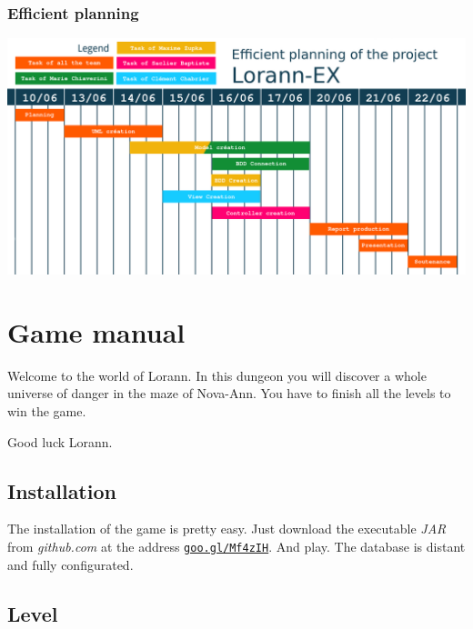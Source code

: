 \documentclass{report}
\begin{document}
\subsection{Efficient planning}

\begin{center}
\includegraphics[scale=0.75]{resources/Planning-effectif.png}
\end{center}

\chapter{Game manual}

Welcome to the world of Lorann. In this dungeon you will discover a whole universe of danger in the maze of Nova-Ann. You have to finish all the levels to win the game.

Good luck Lorann.

\section{Installation}

The installation of the game is pretty easy. Just download the executable \emph{JAR} from \emph{github.com} at the address \texttt{\href{https://github.com/EpicKiwi/Lorann-Ex/releases/download/0.0.2/Lorann-Ex-0.0.2-SNAPSHOT.jar}{goo.gl/Mf4zIH}}. And play. The database is distant and fully configurated.

\section{Level}
\end{document}
